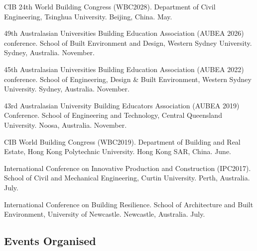 \documentclass[11pt,a4paper]{report} %
\begin{document}
    \begin{tablist}

        \item[2028] \tab{}CIB 24th World Building Congress (WBC2028). Department of Civil Engineering, Tsinghua University. Beijing, China. May.

        \item[2026] \tab{}49th Australasian Universities Building Education Association (AUBEA 2026) conference. School of Built Environment and Design, Western Sydney University. Sydney, Australia. November.

        \item[2022] \tab{}45th Australasian Universities Building Education Association (AUBEA 2022) conference. School of Engineering, Design \& Built Environment, Western Sydney University. Sydney, Australia. November.

        \item[2019] \tab{}43rd Australasian University Building Educators Association (AUBEA 2019) Conference. School of Engineering and Technology, Central Queensland University. Noosa, Australia. November.

        \item[2019] \tab{}CIB World Building Congress (WBC2019). Department of Building and Real Estate, Hong Kong Polytechnic University. Hong Kong SAR, China. June.

        \item[2017] \tab{}International Conference on Innovative Production and Construction (IPC2017). School of Civil and Mechanical Engineering, Curtin University. Perth, Australia. July.

        \item[2015] \tab{}International Conference on Building Resilience. School of Architecture and Built Environment, University of Newcastle. Newcastle, Australia. July.

    \end{tablist}

    \subsection*{Events Organised}
\end{document}
